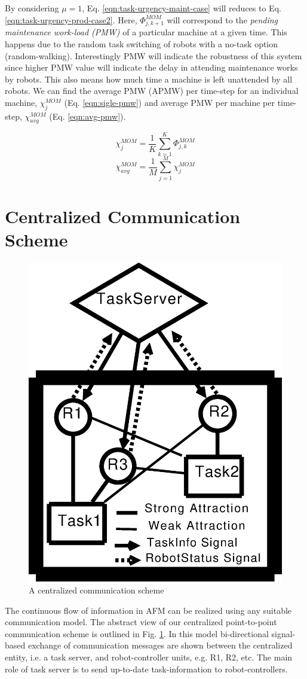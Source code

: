\documentclass[smallcondensed]{svjour3}
\begin{document}
By considering $\mu = 1$, Eq. \ref{eqn:task-urgency-maint-case} will reduces to Eq. \ref{eqn:task-urgency-prod-case2}. Here, $\Phi_{j, k+1}^{MOM}$ will correspond to the {\em pending maintenance work-load (PMW)} of a particular machine at a given time. This happens due to the random task switching of robots with a no-task option (random-walking). Interestingly PMW will indicate the robustness of this system since higher PMW value will indicate the delay in attending maintenance works by robots. This also means how much time a machine is left unattended by all robots. We can find the average PMW (APMW) per time-step for an individual  machine, $\chi_{j}^{MOM}$ (Eq. \ref{eqn:sigle-pmw}) and average PMW per machine per time-step, $\chi_{avg}^{MOM}$ (Eq. \ref{eqn:avg-pmw}).
\begin{multicols}{2}
\small
\begin{equation}
\chi_{j}^{MOM}= \frac{1}{K} \sum_{k=1}^{K} \Phi_{j, k}^{MOM}
\label{eqn:sigle-pmw}
\end{equation}
\vspace*{0.2cm}
\begin{equation}
\chi_{avg}^{MOM}= \frac{1}{M} \sum_{j=1}^{M} {\chi_{j}^{MOM}}
\label{eqn:avg-pmw}
\end{equation}
\end{multicols}
\section{Centralized Communication Scheme}
\label{sec:comm}
\begin{figure}
\centering
\includegraphics[height=0.5\textwidth, angle=0]{./images/CentralizedComm.eps}
\caption{\small A centralized communication scheme} %
\label{fig:ccm} %
\end{figure}
The continuous flow of information in AFM can be realized using any suitable communication model. The abstract view of our centralized point-to-point communication scheme is outlined in Fig. \ref{fig:ccm}. In this model bi-directional signal-based exchange of communication messages are shown between the centralized entity, i.e. a task server, and robot-controller units, e.g. R1, R2, etc. The main role of task server is to send up-to-date task-information to robot-controllers. 
\end{document}
